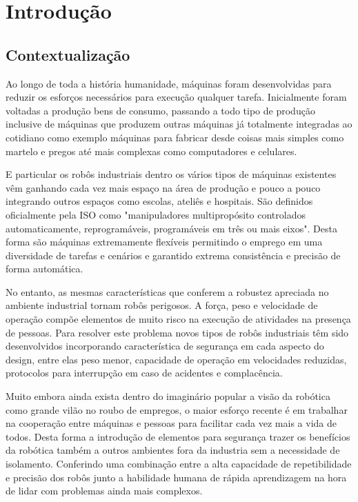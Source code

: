 \chapter{Introdução} \label{ch:intro}


\section{Contextualização}

Ao longo de toda a história humanidade, máquinas foram desenvolvidas para reduzir os esforços necessários para execução qualquer tarefa. Inicialmente foram voltadas a produção bens de consumo, passando a todo tipo de produção inclusive de máquinas que produzem outras máquinas já totalmente integradas ao cotidiano como exemplo máquinas para fabricar desde coisas mais simples como martelo e pregos até mais complexas como computadores e celulares.

E particular os robôs industriais dentro os vários tipos de máquinas existentes vêm ganhando cada vez mais espaço na área de produção e pouco a pouco integrando outros espaços como escolas, ateliês e hospitais. São definidos oficialmente pela ISO como "manipuladores multipropósito controlados automaticamente, reprogramáveis, programáveis em três ou mais eixos". Desta forma são máquinas extremamente flexíveis permitindo o emprego em uma diversidade de tarefas e cenários e garantido extrema consistência e precisão de forma automática.

No entanto, as mesmas características que conferem a robustez apreciada no ambiente industrial tornam robôs perigosos. A força, peso e velocidade de operação compõe elementos de muito risco na execução de atividades na presença de pessoas. Para resolver este problema novos tipos de robôs industriais têm sido desenvolvidos incorporando característica de segurança em cada aspecto do design, entre elas peso menor, capacidade de operação em velocidades reduzidas, protocolos para interrupção em caso de acidentes e complacência.

Muito embora ainda exista dentro do imaginário popular a visão da robótica como grande vilão no roubo de empregos, o maior esforço recente é em trabalhar na cooperação entre máquinas e pessoas para facilitar cada vez mais a vida de todos. Desta forma a introdução de elementos para segurança trazer os benefícios da robótica também a outros ambientes fora da industria sem a necessidade de isolamento. Conferindo uma combinação entre a alta capacidade de repetibilidade e precisão dos robôs junto a habilidade humana de rápida aprendizagem na hora de lidar com problemas ainda mais complexos.

